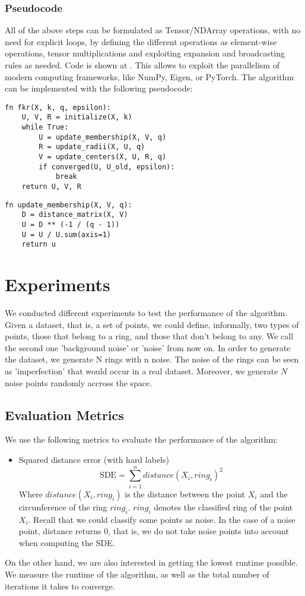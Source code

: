 \documentclass[conference]{IEEEtran}
\begin{document}
\subsubsection{Pseudocode}
All of the above steps can be formulated as Tensor/NDArray operations, with no need for explicit loops,
by defining the different operations as element-wise operations, tensor multiplications and exploiting
expansion and broadcasting rules as needed. Code is shown at \cite{github}.
This allows to exploit the parallelism of modern computing frameworks, like NumPy, Eigen, or PyTorch.
The algorithm can be implemented with the following pseudocode:
\begin{verbatim}
fn fkr(X, k, q, epsilon):
    U, V, R = initialize(X, k)
    while True:
        U = update_membership(X, V, q)
        R = update_radii(X, U, q)
        V = update_centers(X, U, R, q)
        if converged(U, U_old, epsilon):
            break
    return U, V, R
\end{verbatim}
\begin{verbatim}
fn update_membership(X, V, q):
    D = distance_matrix(X, V)
    U = D ** (-1 / (q - 1))
    U = U / U.sum(axis=1)
    return u
\end{verbatim}

\section{Experiments}
We conducted different experiments to test the performance of the algorithm. Given a dataset, that is, a set of points, we could define, informally,
two types of points, those that belong to a ring, and those that don't belong to any. We call the second one 'background noise' or 'noise' from now on.
In order to generate the dataset, we generate N rings with n noise. The noise of the rings can be seen as 'imperfection' that would occur in a real dataset.
Moreover, we generate $N$ noise points randomly accross the space.
\subsection{Evaluation Metrics}
We use the following metrics to evaluate the performance of the algorithm:
\begin{itemize}
    \item Squared distance error (with hard labels)
    \begin{equation}
        \text{SDE} = \sum_{i=1}^{n} distance(X_i, ring_i)^2
    \end{equation}
    Where $distance(X_i, ring_i)$ is the distance between the point $X_i$ and the circunference of the ring $ring_i$.
    $ring_i$ denotes the classified ring of the point $X_i$.
    Recall that we could classify some points as noise. In the case of a noise point, distance returns 0, that is,
    we do not take noise points into account when computing the SDE.
\end{itemize}
On the other hand, we are also interested in getting the lowest runtime possible. We measure the runtime of the algorithm, as well as the total number of iterations it takes to converge.
\end{document}
